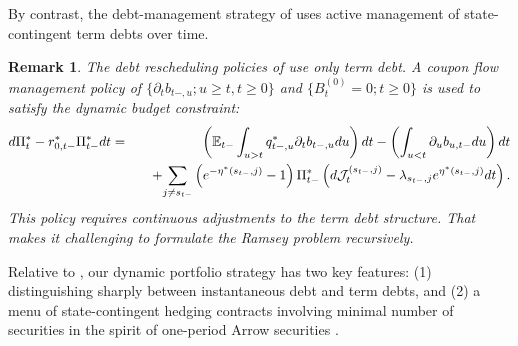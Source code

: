 \documentclass[12pt]{article}
\newtheorem{remark}[theorem]{Remark}
\newcommand{\NW}[1]{{\textcolor{blue}{#1}}}
\newcommand{\TS}[1]{{\textcolor{magenta}{#1}}}
\begin{document}
By contrast, the debt-management strategy of \cite{LucasStokey1983} uses  active management of state-contingent term debts over time. 
\begin{remark}
	The debt rescheduling policies of  \cite{LucasStokey1983} use only term debt. A coupon flow management policy of $\{\partial_t b_{t-, u}; u\geq t,  t\geq 0 \}$ and $\{B_t^{(0)}=0; t\geq 0\}$  is used  to satisfy the dynamic budget constraint: 
	\begin{eqnarray} \label{dynamicbudgetconstraint-t}
	d\Pi ^\ast_t -r^*_{0, t-}\Pi_{t-}^\ast dt& = &  \left( \mathbb E_{t-} \int_{u> t} q^\ast_{t-, u}\partial_tb_{t-, u} du \right) dt  -\left(\int_{u<t} \partial_u b_{u, t-} du\right)dt  \notag \\
	& & \quad + {\sum_{j\neq s_{t-}} \left(e^{-\eta^*(s_{t-}, j)}-1 \right)\Pi_{t-}^* \left(d {\mathcal J}_t^{(s_{t-}, j)} - \lambda_{s_{t-}, j}e^{\eta^*(s_{t-}, j)}d t \right)} \,.
	\end{eqnarray} 
	This policy requires  continuous adjustments to the term debt structure. That makes it challenging to formulate the Ramsey problem recursively. %
\end{remark}

Relative to   \cite{LucasStokey1983}, our dynamic portfolio strategy  has two key features: (1) distinguishing sharply  between instantaneous debt and term debts, and (2) a menu of state-contingent hedging contracts involving minimal number of securities in the spirit of one-period Arrow securities \citep{arrow1964role}.
%
%
\end{document}
